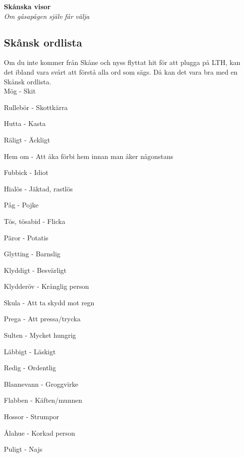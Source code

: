 \begin{center}
    \vspace*{1.5cm}
    {\fontsize{20}{20}\textbf{Skånska visor}}\\
    \vspace{0.7cm}
    {\fontsize{12}{12}\textit{Om gåsapågen själv får välja}}
\end{center}
\noBackground

\newpage
\resetBackground



\subsection*{Skånsk ordlista}

Om du inte kommer från Skåne och nyss flyttat hit för att plugga på LTH, 
kan det ibland vara svårt att förstå alla ord som sägs. Då kan det vara bra
med en Skånsk ordlista. \\



Mög - Skit

Rullebör - Skottkärra

Hutta - Kasta

Räligt - Äckligt

Hem om - Att åka förbi hem innan man åker någonstans

Fubbick - Idiot

Hialös - Jäktad, rastlös

Påg - Pojke

Tös, tösabid - Flicka

Päror - Potatis

Glytting - Barnslig

Klyddigt - Besvärligt

Klydderöv - Krånglig person

Skula - Att ta skydd mot regn

Prega - Att pressa/trycka

Sulten - Mycket hungrig

Läbbigt - Läskigt

Redig - Ordentlig

Blannevann - Groggvirke

Flabben - Käften/munnen

Hossor - Strumpor

Ålahue - Korkad person

Puligt - Najs

